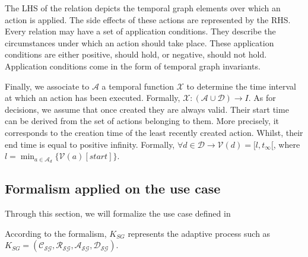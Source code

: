 The LHS of the relation depicts the temporal graph elements over which an action is applied. The side effects of these actions are represented by the RHS. Every relation may have a set of application conditions. They describe the circumstances under which an action should take place. These application conditions are either positive, should hold, or negative, should not hold. Application conditions come in the form of temporal graph  invariants. 

Finally, we associate to $\mathcal{A}$ a temporal function $\mathcal{X}$ to determine the time interval at which  an action has been executed. Formally, $\mathcal{X}: (\mathcal{A} \cup \mathcal{D}) \rightarrow I$. As for decisions, we assume that once created they are always valid.  Their start time can be derived from the set of actions belonging to them. More precisely,  it corresponds to the creation time of the least recently created action. Whilst, their end time is equal to positive infinity.   Formally, $\forall d \in \mathcal{D} \rightarrow \mathcal{V}(d) = [l,t_\infty[$, where $l = \displaystyle \min_{a \in \mathcal{A}_d} \{\mathcal{V}(a)[start]\}$.

\subsection{Formalism applied on the use case}

Through this section, we will formalize the use case defined in



According to the formalism, $K_{SG}$ represents the adaptive process such as $K_{SG}=(\mathcal{C_{SG}},\mathcal{R_{SG}},\mathcal{A_{SG}}, \mathcal{D_{SG}})$.



